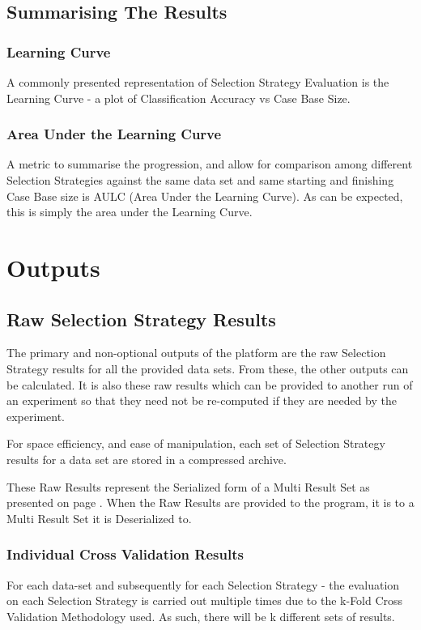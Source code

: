 \documentclass[a4paper,11pt]{report}
\begin{document}
\subsection{Summarising The Results}
\subsubsection{Learning Curve}\label{sec:multiresultset}
A commonly presented representation of Selection Strategy Evaluation is the Learning Curve - a plot of Classification Accuracy vs Case Base Size.

\subsubsection{Area Under the Learning Curve}
A metric to summarise the progression, and allow for comparison among different Selection Strategies against the same data set and same starting and finishing Case Base size is AULC (Area Under the Learning Curve). As can be expected, this is simply the area under the Learning Curve.

\section{Outputs}

\subsection{Raw Selection Strategy Results}
The primary and non-optional outputs of the platform are the raw Selection Strategy results for all the provided data sets. From these, the other outputs can be calculated. It is also these raw results which can be provided to another run of an experiment so that they need not be re-computed if they are needed by the experiment. 

For space efficiency, and ease of manipulation, each set of Selection Strategy results for a data set are stored in a compressed archive.

These Raw Results represent the Serialized form of a Multi Result Set as presented on page \pageref{sec:multiresultset}. When the Raw Results are provided to the program, it is to a Multi Result Set it is Deserialized to.

\subsubsection{Individual Cross Validation Results}
For each data-set and subsequently for each Selection Strategy - the evaluation on each Selection Strategy is carried out multiple times due to the k-Fold Cross Validation Methodology used. As such, there will be k different sets of results. 
\end{document}
